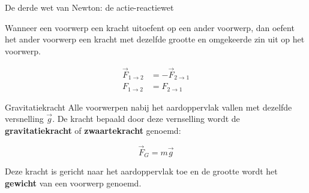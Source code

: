 \begin{lem}{De derde wet van Newton: de actie-reactiewet}

Wanneer een voorwerp een kracht uitoefent op een ander voorwerp, dan oefent het ander voorwerp een kracht met dezelfde grootte en omgekeerde zin uit op het voorwerp.

    \begin{align*}
        \Vec{F}_{1 \to 2} &= -\Vec{F}_{2 \to 1} \\
       F_{1 \to 2} &= F_{2 \to 1}
    \end{align*}

\end{lem}

\newpage

\begin{theo}[Gravitatiekracht]{Gravitatiekracht}
Alle voorwerpen nabij het aardoppervlak vallen met dezelfde versnelling $ \Vec{g} $. De kracht bepaald door deze vernselling wordt de \textbf{gravitatiekracht} of \textbf{zwaartekracht} genoemd:

    \begin{equation*}
        \Vec{F}_G = m\Vec{g}
    \end{equation*}

\noindent Deze kracht is gericht naar het aardoppervlak toe en de grootte wordt het \textbf{gewicht} van een voorwerp genoemd. 

\end{theo}

